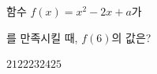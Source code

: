 함수 $f(x)=x^2-2x+a$가 \par\smallskip{}\par\smallskip\noindent 를 만족시킬 때, $f(6)$의 값은? 
\begin{choices32}{$21$}{$22$}{$23$}{$24$}{$25$}\end{choices32}
